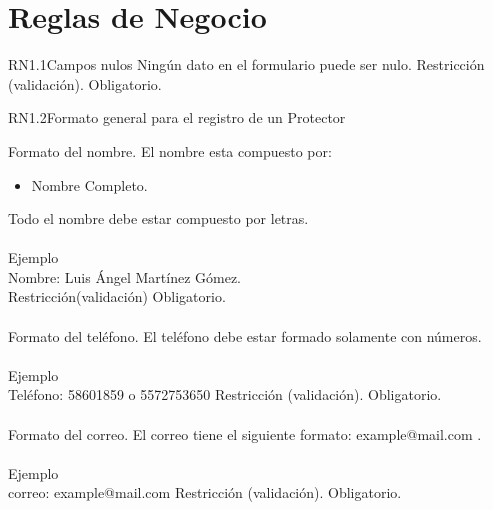 \section{Reglas de Negocio}

\begin{BussinesRule}{RN1.1}{Campos nulos}
	\BRitem[Descripción:] Ningún dato en el formulario puede ser nulo.
	\BRitem[Tipo:] Restricción (validación).
	\BRitem[Nivel:] Obligatorio.
\end{BussinesRule}


\begin{BussinesRule}{RN1.2}{Formato general para el registro de un Protector}

	\BRitem[Nombre:] Formato del nombre.
	\BRitem[Descripción:] El nombre esta compuesto por:
		\begin{itemize}
			\item Nombre Completo.
		\end{itemize}
	Todo el nombre debe estar compuesto por letras.\\\\
	Ejemplo \\
	Nombre: Luis Ángel Martínez Gómez.\\
	\BRitem[Tipo:] Restricción(validación)
	\BRitem[Nivel:] Obligatorio.\\\\

	\BRitem[Teléfono:] Formato del teléfono.
	\BRitem[Descripción:] El teléfono debe estar formado solamente con números.\\\\
	Ejemplo \\
	Teléfono: 58601859 o 5572753650
	\BRitem[Tipo:] Restricción (validación).
	\BRitem[Nivel:] Obligatorio.\\\\

	\BRitem[Correo:] Formato del correo.
	\BRitem[Descripción:] El correo tiene el siguiente formato: example@mail.com .\\\\
	Ejemplo \\
	correo: example@mail.com
	\BRitem[Tipo:] Restricción (validación).
	\BRitem[Nivel:] Obligatorio.\\\\


\end{BussinesRule}
